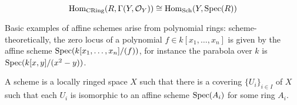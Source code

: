\[
	\operatorname{Hom}_{\text{CRing}}(R, \Gamma(Y,\mathcal{O}_Y)) \cong \operatorname{Hom}_{\text{Sch}}(Y, \operatorname{Spec}(R))
\]

Basic examples of affine schemes arise from polynomial rings: scheme-theoretically, the zero locus of a polynomial $f \in k[x_1, \dots, x_n]$ is given by the affine scheme $\operatorname{Spec}(k[x_1, \dots, x_n]/(f))$, for instance the parabola over $k$ is $\operatorname{Spec}(k[x,y]/(x^2-y))$.

\begin{definition}
	A scheme is a locally ringed space $X$ such that there is a covering $\{U_i\}_{i \in I}$ of $X$ such that each $U_i$ is isomorphic to an affine scheme $\operatorname{Spec}(A_i)$ for some ring $A_i$.
\end{definition}

%
%
%
%
%
